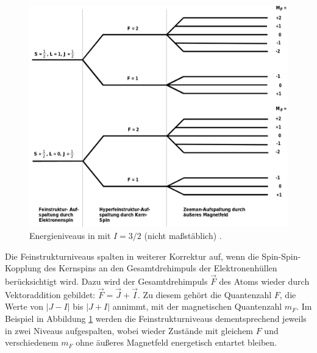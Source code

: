   \begin{figure}
    \centering
    \includegraphics[width=\textwidth]{pictures/energieniveaus.png}
    \caption{Energieniveaus in  mit $I=3/2$ (nicht maßstäblich) \cite{stehendeWelle}.}
    \label{fig:energieniveaus}
  \end{figure}

  Die Feinstrukturniveaus spalten in weiterer Korrektur auf, wenn die Spin-Spin-Kopplung des Kernspins an den Gesamtdrehimpuls der Elektronenhüllen berücksichtigt wird. Dazu wird der Gesamtdrehimpuls $\vec{F}$ des Atoms wieder durch Vektoraddition gebildet: $\vec{F} = \vec{J} + \vec{I}$. Zu diesem gehört die Quantenzahl $F$, die Werte von $\lvert J - I \rvert$ bis $\lvert J + I \rvert$ annimmt, mit der magnetischen Quantenzahl $m_F$. Im Beispiel in Abbildung \ref{fig:energieniveaus} werden die Feinstrukturniveaus dementsprechend jeweils in zwei Niveaus aufgespalten, wobei wieder Zustände mit gleichem $F$ und verschiedenem $m_F$ ohne äußeres Magnetfeld energetisch entartet bleiben.

  \cite{Kernspins von Rubidium erwähnen?}

